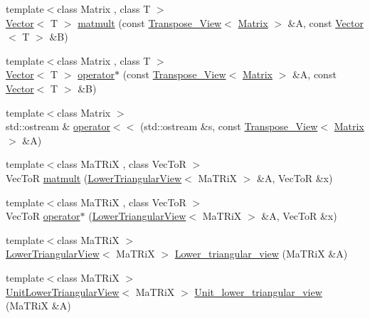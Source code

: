 \begin{DoxyCompactItemize}
{\footnotesize template$<$class Matrix , class T $>$ }\\\hyperlink{class_t_n_t_1_1_vector}{Vector}$<$ T $>$ \hyperlink{namespace_t_n_t_a5e35a0a5d4507d7dc274fa0399252000}{matmult} (const \hyperlink{class_t_n_t_1_1_transpose___view}{Transpose\_\-View}$<$ \hyperlink{class_t_n_t_1_1_matrix}{Matrix} $>$ \&A, const \hyperlink{class_t_n_t_1_1_vector}{Vector}$<$ T $>$ \&B)
\item 
{\footnotesize template$<$class Matrix , class T $>$ }\\\hyperlink{class_t_n_t_1_1_vector}{Vector}$<$ T $>$ \hyperlink{namespace_t_n_t_aa6782c3fa7e3a339434cc420242f11b1}{operator$\ast$} (const \hyperlink{class_t_n_t_1_1_transpose___view}{Transpose\_\-View}$<$ \hyperlink{class_t_n_t_1_1_matrix}{Matrix} $>$ \&A, const \hyperlink{class_t_n_t_1_1_vector}{Vector}$<$ T $>$ \&B)
\item 
{\footnotesize template$<$class Matrix $>$ }\\std::ostream \& \hyperlink{namespace_t_n_t_a6034dfdd9bbc03b3a635ee630ed7d73e}{operator$<$$<$} (std::ostream \&s, const \hyperlink{class_t_n_t_1_1_transpose___view}{Transpose\_\-View}$<$ \hyperlink{class_t_n_t_1_1_matrix}{Matrix} $>$ \&A)
\item 
{\footnotesize template$<$class MaTRiX , class VecToR $>$ }\\VecToR \hyperlink{namespace_t_n_t_abe1cf12459613187ec83a2840af485f5}{matmult} (\hyperlink{class_t_n_t_1_1_lower_triangular_view}{LowerTriangularView}$<$ MaTRiX $>$ \&A, VecToR \&x)
\item 
{\footnotesize template$<$class MaTRiX , class VecToR $>$ }\\VecToR \hyperlink{namespace_t_n_t_af6106db681ef762d556bfa8799ea63b3}{operator$\ast$} (\hyperlink{class_t_n_t_1_1_lower_triangular_view}{LowerTriangularView}$<$ MaTRiX $>$ \&A, VecToR \&x)
\item 
{\footnotesize template$<$class MaTRiX $>$ }\\\hyperlink{class_t_n_t_1_1_lower_triangular_view}{LowerTriangularView}$<$ MaTRiX $>$ \hyperlink{namespace_t_n_t_a27a6a03163b1d42f970caa7be7c452d4}{Lower\_\-triangular\_\-view} (MaTRiX \&A)
\item 
{\footnotesize template$<$class MaTRiX $>$ }\\\hyperlink{class_t_n_t_1_1_unit_lower_triangular_view}{UnitLowerTriangularView}$<$ MaTRiX $>$ \hyperlink{namespace_t_n_t_a8a864cadcadb3df0af49aae3c31042e6}{Unit\_\-lower\_\-triangular\_\-view} (MaTRiX \&A)
\item 

\end{DoxyCompactItemize}
